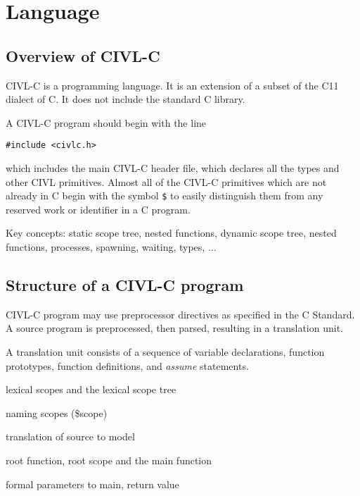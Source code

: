 \part{Language}
\label{part:lang}

\chapter{Overview of CIVL-C}

CIVL-C is a programming language.  It is an extension of a subset of
the C11 dialect of C.  It does not include the standard C library.

A CIVL-C program should begin with the line
\begin{verbatim}
#include <civlc.h>
\end{verbatim}
which includes the main CIVL-C header file, which declares all the
types and other CIVL primitives.  Almost all of the CIVL-C primitives
which are not already in C begin with the symbol \texttt{\$} to easily
distinguish them from any reserved work or identifier in a C program.  

Key concepts: static scope tree, nested functions, dynamic scope tree,
nested functions, processes, spawning, waiting, types, ...


\chapter{Structure of a CIVL-C program}

CIVL-C program may use preprocessor directives as specified in the C
Standard.  A source program is preprocessed, then parsed, resulting
in a translation unit.

A translation unit consists of a sequence of variable declarations,
function prototypes, function definitions, and \emph{assume}
statements.

lexical scopes and the lexical scope tree

naming scopes (\$scope)

translation of source to model

root function, root scope and the  main function

formal parameters to main, return value




